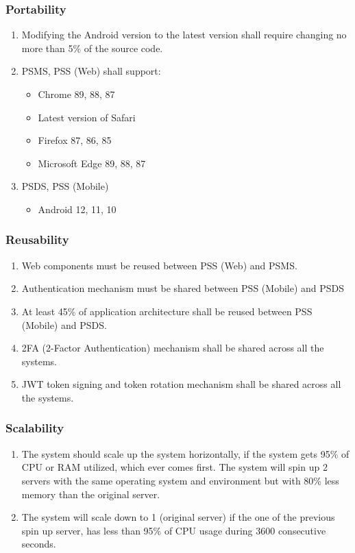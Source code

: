 \subsubsection{Portability}
\begin{enumerate}[label=POR-\arabic*]
    \item Modifying the Android version to the latest version shall require 
    changing no more than 5\% of the source code.
    \item PSMS, PSS (Web) shall support:
    \begin{itemize}
        \item Chrome 89, 88, 87
        \item Latest version of Safari
        \item Firefox 87, 86, 85
        \item Microsoft Edge 89, 88, 87
    \end{itemize}
    \item PSDS, PSS (Mobile)
    \begin{itemize}
        \item Android 12, 11, 10
    \end{itemize}
\end{enumerate}
\subsubsection{Reusability}
\begin{enumerate}[label=REU-\arabic*]
    \item Web components must be reused between PSS (Web) and PSMS.
    \item Authentication mechanism must be shared between PSS (Mobile) and PSDS
    \item At least 45\% of application architecture shall be reused 
    between PSS (Mobile) and PSDS.
    \item 2FA (2-Factor Authentication) mechanism shall be shared across 
    all the systems.
    \item JWT token signing and token rotation mechanism shall be shared 
    across all the systems.
\end{enumerate}

\subsubsection{Scalability}
\begin{enumerate}[label=SCA-\arabic*]
    \item The system should scale up the system horizontally, if the system 
    gets 95\% of CPU or RAM utilized, which ever comes first. The system will 
    spin up 2 servers with the same operating system and environment 
    but with 80\% less memory than the original server.
    \item The system will scale down to 1 (original server) if the one of the 
    previous spin up server, has less than 95\% of CPU usage during 3600 
    consecutive seconds.
\end{enumerate}
\pagebreak
